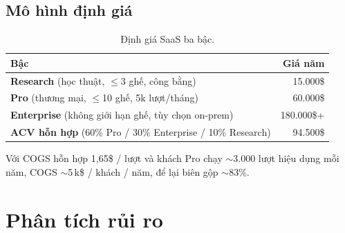 \documentclass[11pt,a4paper]{report}
\begin{document}
\section{Mô hình định giá}

\begin{table}[h]
\centering
\caption{Định giá SaaS ba bậc.}
\label{tab:pricing}
\begin{tabular}{lr}
\toprule
\textbf{Bậc} & \textbf{Giá năm} \\
\midrule
\textbf{Research} (học thuật, $\leq$3 ghế, công bằng) & 15.000\$ \\
\textbf{Pro} (thương mại, $\leq$10 ghế, 5k lượt/tháng) & 60.000\$ \\
\textbf{Enterprise} (không giới hạn ghế, tùy chọn on-prem) & 180.000\$+ \\
\midrule
\textbf{ACV hỗn hợp} (60\% Pro / 30\% Enterprise / 10\% Research) & 94.500\$ \\
\bottomrule
\end{tabular}
\end{table}

Với COGS hỗn hợp 1{,}65\$ / lượt và khách Pro chạy $\sim$3.000 lượt hiệu dụng mỗi năm,
COGS $\sim$5\,k\$ / khách / năm, để lại biên gộp $\sim$83\%.

\chapter{Phân tích rủi ro}
\end{document}
